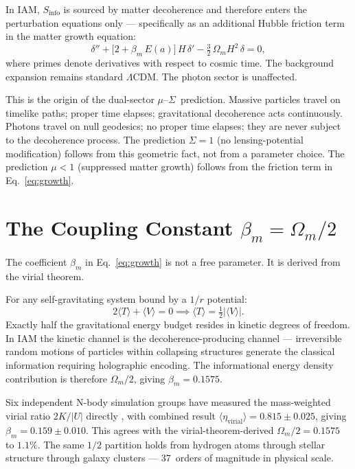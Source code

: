 \documentclass[12pt]{article}
\newcommand{\Oms}{\Omega_m}
\newcommand{\bm}{\beta_m}
\newcommand{\Ea}{E(a)}
\newcommand{\Sinfo}{S_\mathrm{info}}
\newcommand{\LCDM}{$\Lambda$CDM}
\newcommand{\musig}{$\mu$--$\Sigma$}
\begin{document}
In IAM, $\Sinfo$ is sourced by matter decoherence and therefore enters the
perturbation equations only --- specifically as an additional Hubble friction term
in the matter growth equation:
\begin{equation}
  \delta'' + \bigl[2 + \bm\,\Ea\bigr]\,H\,\delta' - \tfrac{3}{2}\,\Oms H^2\,\delta = 0,
  \label{eq:growth}
\end{equation}
where primes denote derivatives with respect to cosmic time.  The background
expansion remains standard \LCDM.  The photon sector is unaffected.

This is the origin of the dual-sector \musig\ prediction.  Massive particles
travel on timelike paths; proper time elapses; gravitational decoherence acts
continuously.  Photons travel on null geodesics; no proper time elapses; they are
never subject to the decoherence process.  The prediction $\Sigma = 1$ (no
lensing-potential modification) follows from this geometric fact, not from a
parameter choice.  The prediction $\mu < 1$ (suppressed matter growth) follows
from the friction term in Eq.~\eqref{eq:growth}.

\section{The Coupling Constant \texorpdfstring{$\beta_m = \Omega_m/2$}{beta\_m}}

The coefficient $\bm$ in Eq.~\eqref{eq:growth} is not a free parameter.  It is
derived from the virial theorem.

For any self-gravitating system bound by a $1/r$ potential:
\begin{equation}
  2\langle T\rangle + \langle V\rangle = 0
  \implies
  \langle T\rangle = \tfrac{1}{2}|\langle V\rangle|.
  \label{eq:virial}
\end{equation}
Exactly half the gravitational energy budget resides in kinetic degrees of freedom.
In IAM the kinetic channel is the decoherence-producing channel --- irreversible
random motions of particles within collapsing structures generate the classical
information requiring holographic encoding.  The informational energy density
contribution is therefore $\Oms/2$, giving $\bm = 0.1575$.

Six independent N-body simulation groups have measured the mass-weighted virial
ratio $2K/|U|$ directly \citep{Bryan1998, Bett2007, Neto2007, Ludlow2010,
Power2012, Klypin2016}, with combined result $\langle\eta_\mathrm{virial}\rangle =
0.815\pm0.025$, giving $\bm = 0.159\pm0.010$.  This agrees with the
virial-theorem-derived $\Oms/2 = 0.1575$ to $1.1\%$.  The same $1/2$ partition
holds from hydrogen atoms through stellar structure through galaxy clusters ---
37~orders of magnitude in physical scale.
\end{document}
